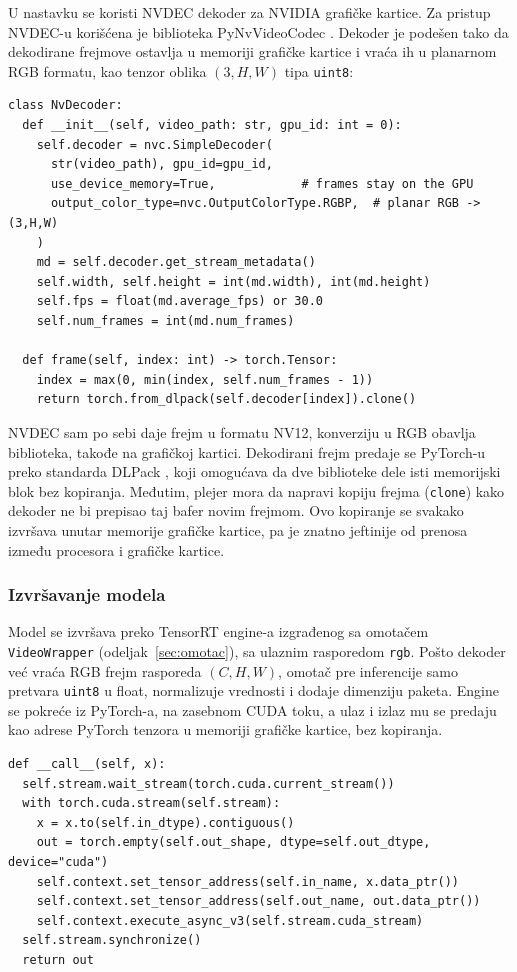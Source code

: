 \documentclass[12pt,a4paper]{article}
\begin{document}
U nastavku se koristi NVDEC dekoder za NVIDIA grafičke kartice. Za pristup NVDEC-u korišćena je biblioteka PyNvVideoCodec \cite{PyNvVideoCodec}. Dekoder je podešen tako da dekodirane frejmove ostavlja u memoriji grafičke kartice i vraća ih u planarnom RGB formatu, kao tenzor oblika $(3,H,W)$ tipa \texttt{uint8}:

\begin{verbatim}
class NvDecoder:
  def __init__(self, video_path: str, gpu_id: int = 0):
    self.decoder = nvc.SimpleDecoder(
      str(video_path), gpu_id=gpu_id,
      use_device_memory=True,            # frames stay on the GPU
      output_color_type=nvc.OutputColorType.RGBP,  # planar RGB -> (3,H,W)
    )
    md = self.decoder.get_stream_metadata()
    self.width, self.height = int(md.width), int(md.height)
    self.fps = float(md.average_fps) or 30.0
    self.num_frames = int(md.num_frames)

  def frame(self, index: int) -> torch.Tensor:
    index = max(0, min(index, self.num_frames - 1))
    return torch.from_dlpack(self.decoder[index]).clone()
\end{verbatim}

NVDEC sam po sebi daje frejm u formatu NV12, konverziju u RGB obavlja biblioteka, takođe na grafičkoj kartici. Dekodirani frejm predaje se PyTorch-u preko standarda DLPack \cite{DLPack}, koji omogućava da dve biblioteke dele isti memorijski blok bez kopiranja. Međutim, plejer mora da napravi kopiju frejma (\texttt{clone}) kako dekoder ne bi prepisao taj bafer novim frejmom. Ovo kopiranje se svakako izvršava unutar memorije grafičke kartice, pa je znatno jeftinije od prenosa između procesora i grafičke kartice.

\subsubsection{Izvršavanje modela}

Model se izvršava preko TensorRT engine-a izgrađenog sa omotačem \texttt{VideoWrapper} (odeljak~\ref{sec:omotac}), sa ulaznim rasporedom \texttt{rgb}. Pošto dekoder već vraća RGB frejm rasporeda $(C,H,W)$, omotač pre inferencije samo pretvara \texttt{uint8} u float, normalizuje vrednosti i dodaje dimenziju paketa. Engine se pokreće iz PyTorch-a, na zasebnom CUDA toku, a ulaz i izlaz mu se predaju kao adrese PyTorch tenzora u memoriji grafičke kartice, bez kopiranja.

\begin{verbatim}
def __call__(self, x):
  self.stream.wait_stream(torch.cuda.current_stream())
  with torch.cuda.stream(self.stream):
    x = x.to(self.in_dtype).contiguous()
    out = torch.empty(self.out_shape, dtype=self.out_dtype, device="cuda")
    self.context.set_tensor_address(self.in_name, x.data_ptr())
    self.context.set_tensor_address(self.out_name, out.data_ptr())
    self.context.execute_async_v3(self.stream.cuda_stream)
  self.stream.synchronize()
  return out
\end{verbatim}
\end{document}
